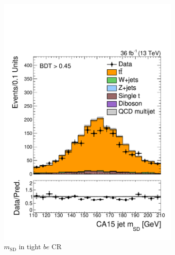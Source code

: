 \begin{figure}[]
\begin{center}
\begin{subfigure}[t]{0.32\textwidth}
            \includegraphics[width=\textwidth]{figures/monotop/prefit/singleelectrontop_tight_fj1MSD.pdf}
            \caption{$m_\mathrm{SD}$ in tight $be$ CR}
        \end{subfigure}
        \begin{subfigure}[t]{0.32\textwidth}

\end{subfigure}
\end{center}
\end{figure}
